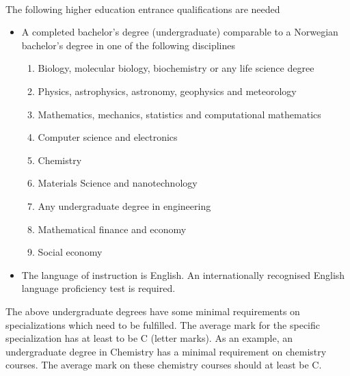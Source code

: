 \documentclass[%
oneside,                 %
final,                   %
10pt]{article}
\begin{document}
\paragraph{}
The following higher education entrance qualifications are needed

\begin{itemize}
\item A completed bachelor's degree (undergraduate) comparable to a Norwegian bachelor's degree in one of the following disciplines
\begin{enumerate}

 \item Biology, molecular biology, biochemistry  or any life science degree

 \item Physics, astrophysics, astronomy, geophysics and meteorology

 \item Mathematics, mechanics, statistics and computational mathematics

 \item Computer science and electronics

 \item Chemistry

 \item Materials Science and nanotechnology

 \item Any undergraduate degree in engineering

 \item Mathematical finance and economy

 \item Social economy

\end{enumerate}

\noindent
\item The language of instruction is English. An internationally recognised English language proficiency test is required.
\end{itemize}

\noindent
The above undergraduate degrees have some minimal requirements on specializations which need to be fulfilled.  The average mark
for the specific specialization has at least to be C (letter marks).
As an example, an undergraduate degree in Chemistry has a minimal requirement on chemistry courses. The average mark on these chemistry courses should
at least be C.
\end{document}
